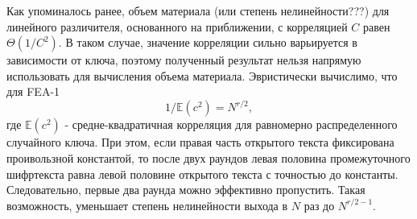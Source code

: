 \documentclass[utf8x, 14pt]{G7-32} %
\begin{document}
Как упоминалось ранее, объем материала (или степень нелинейности???) для линейного различителя, основанного на приближении, с корреляцией $C$ равен $\Theta (1/C^2)$. В таком случае, значение корреляции сильно варьируется в зависимости от ключа, поэтому полученный результат нельзя напрямую использовать для вычисления объема материала. Эвристически вычислимо, что для FEA-1
\begin{equation}
\label{eqn:keyeq}
1/\mathbb{E}(c^2)=N^{r/2},\end{equation} 
где $\mathbb{E}(c^2)$ - средне-квадратичная корреляция для равномерно распределенного случайного ключа. При этом, если правая часть открытого текста фиксирована проивользной константой, то после двух раундов левая половина промежуточного шифртекста равна левой половине открытого текста с точностью до константы. Следовательно, первые два раунда можно эффективно пропустить. Такая возможность, уменьшает степень нелинейности выхода в $N$ раз до $N^{r/2-1}$.







\backmatter %





%

%
\end{document}
